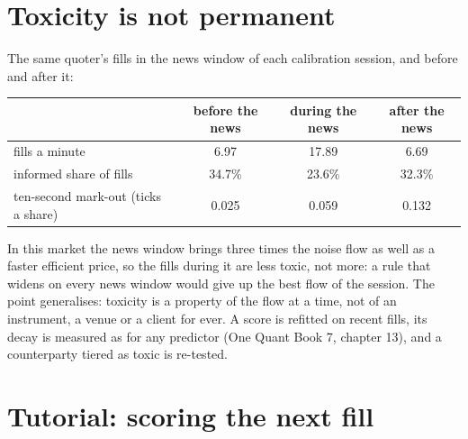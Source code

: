 \section{Toxicity is not permanent}

The same quoter's fills in the news window of each calibration session, and before and after it:

\begin{center}
\small
\begin{tabular}{@{}lccc@{}}
\toprule
& before the news & during the news & after the news\\
\midrule
fills a minute & 6.97 & 17.89 & 6.69\\
informed share of fills & 34.7\% & 23.6\% & 32.3\%\\
ten-second mark-out (ticks a share) & 0.025 & 0.059 & 0.132\\
\bottomrule
\end{tabular}
\end{center}

In this market the news window brings three times the noise flow as well as a faster efficient price, so the fills during it are less toxic, not
more: a rule that widens on every news window would give up the best flow of the session. The point generalises: toxicity is a property of the flow
at a time, not of an instrument, a venue or a client for ever. A score is refitted on recent fills, its decay is measured as for any predictor (One
Quant Book 7, chapter 13), and a counterparty tiered as toxic is re-tested.

\section{Tutorial: scoring the next fill}\label{tut:hf:adverse-selection-and-toxicity:tut}

